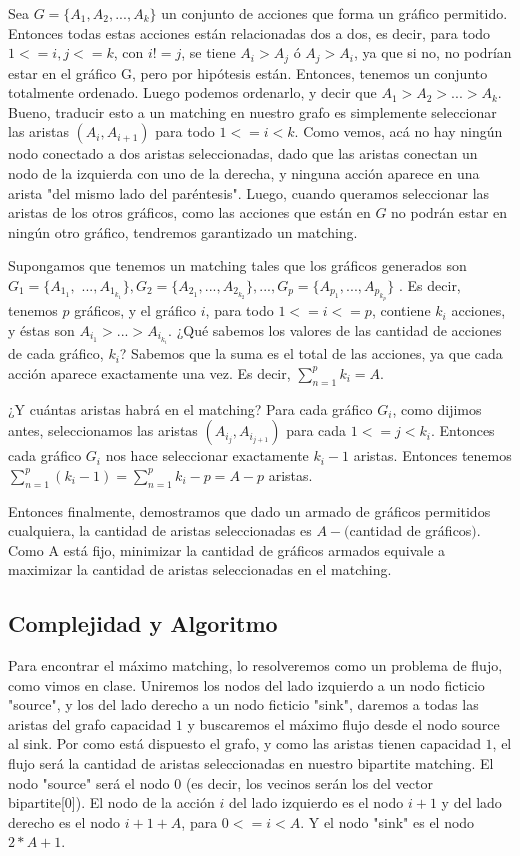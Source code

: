 \documentclass[a4paper]{article}
\begin{document}
Sea $G=\{A_1, A_2, ..., A_k\}$ un conjunto de acciones que forma un gráfico permitido.
Entonces todas estas acciones están relacionadas dos a dos, es decir, para todo $1<=i, j<=k$, con $i!=j$, se tiene $A_i>A_j$ ó $A_j>A_i$, ya que si no, no podrían estar en el gráfico G, pero por hipótesis están.
Entonces, tenemos un conjunto totalmente ordenado. Luego podemos ordenarlo, y decir que $A_1>A_2>...>A_k$. Bueno, traducir esto a un matching en nuestro grafo es simplemente seleccionar las aristas $(A_i, A_{i+1})$ para todo $1<=i<k$. Como vemos, acá no hay ningún nodo conectado a dos aristas seleccionadas, dado que las aristas conectan un nodo de la izquierda con uno de la derecha, y ninguna acción aparece en una arista "del mismo lado del paréntesis".
Luego, cuando queramos seleccionar las aristas de los otros gráficos, como las acciones que están en $G$ no podrán estar en ningún otro gráfico, tendremos garantizado un matching.

Supongamos que tenemos un matching tales que los gráficos generados son $G_1=\{A_{1_1},$ $ ..., A_{1_{k_1}}\}, G_2=\{A_{2_1}, ..., A_{2_{k_2}}\}, ..., G_p=\{A_{p_1}, ..., A_{p_{k_p}}\}$ . Es decir, tenemos $p$ gráficos, y el gráfico $i$, para todo $1<=i<=p$, contiene $k_i$ acciones, y éstas son $A_{i_1}> ...> A_{i_{k_i}}$.
¿Qué sabemos los valores de las cantidad de acciones de cada gráfico, $k_i$? Sabemos que la suma es el total de las acciones, ya que cada acción aparece exactamente una vez. Es decir, $\sum_{n=1}^{p} k_i = A$.

¿Y cuántas aristas habrá en el matching? Para cada gráfico $G_i$, como dijimos antes, seleccionamos las aristas $(A_{i_j}, A_{i_{j+1}})$ para cada $1<=j<k_i$. Entonces cada gráfico $G_i$ nos hace seleccionar exactamente $k_i-1$ aristas.
Entonces tenemos $\sum_{n=1}^{p} (k_i-1) = \sum_{n=1}^{p} k_i - p = A-p$ aristas.

Entonces finalmente, demostramos que dado un armado de gráficos permitidos cualquiera, la cantidad de aristas seleccionadas es $A-($cantidad de gráficos$)$. Como A está fijo, minimizar la cantidad de gráficos armados equivale a maximizar la cantidad de aristas seleccionadas en el matching.


\subsection{Complejidad y Algoritmo} 

Para encontrar el máximo matching, lo resolveremos como un problema de flujo, como vimos en clase. Uniremos los nodos del lado izquierdo a un nodo ficticio "source", y los del lado derecho a un nodo ficticio "sink", daremos a todas las aristas del grafo capacidad $1$ y buscaremos el máximo flujo desde el nodo source al sink. Por como está dispuesto el grafo, y como las aristas tienen capacidad $1$, el flujo será la cantidad de aristas seleccionadas en nuestro bipartite matching.
El nodo "source" será el nodo 0 (es decir, los vecinos serán los del vector bipartite[0]). El nodo de la acción $i$ del lado izquierdo es el nodo $i+1$ y del lado derecho es el nodo $i+1+A$, para $0<=i<A$. Y el nodo "sink" es el nodo $2*A+1$.
\end{document}
